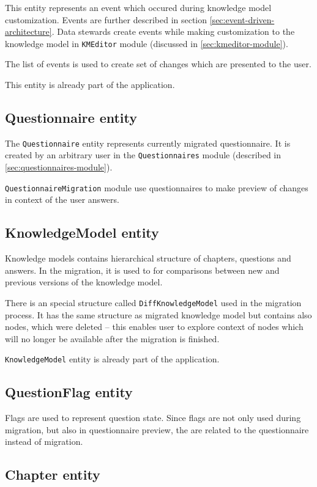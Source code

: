 This entity represents an event which occured during knowledge model customization.
Events are further described in section \ref{sec:event-driven-architecture}.
Data stewards create events while making customization to the knowledge model in \texttt{KMEditor} module (discussed in \ref{sec:kmeditor-module}).

The list of events is used to create set of changes which are presented to the user.

This entity is already part of the application.

\subsection{Questionnaire entity}

The \texttt{Questionnaire} entity represents currently migrated questionnaire.
It is created by an arbitrary user in the \texttt{Questionnaires} module (described in \ref{sec:questionnaires-module}).

\texttt{QuestionnaireMigration} module use questionnaires to make preview of changes in context of the user answers.

\subsection{KnowledgeModel entity}

Knowledge models contains hierarchical structure of chapters, questions and answers.
In the migration, it is used to for comparisons between new and previous versions of the knowledge model.

There is an special structure called \texttt{DiffKnowledgeModel} used in the migration process.
It has the same structure as migrated knowledge model but contains also nodes, which were deleted -- this enables user to explore context of nodes which will no longer be available after the migration is finished.

\texttt{KnowledgeModel} entity is already part of the application.

\subsection{QuestionFlag entity}

Flags are used to represent question state.
Since flags are not only used during migration, but also in questionnaire preview, the are related to the questionnaire instead of migration.

\subsection{Chapter entity}


